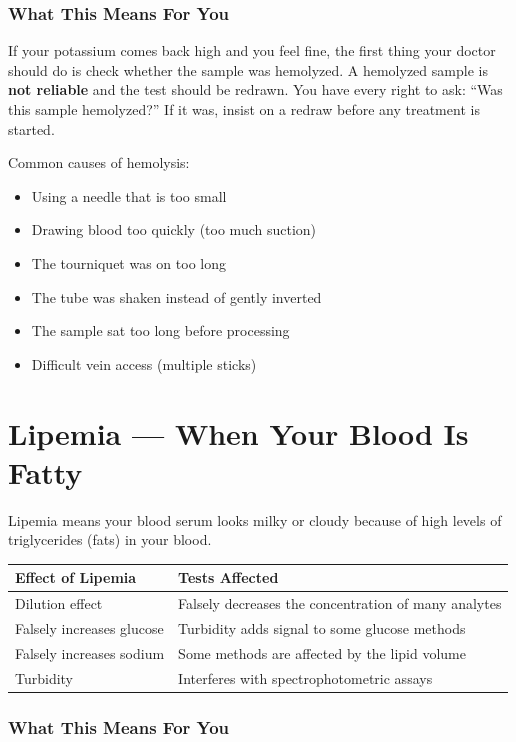 \subsubsection{What This Means For You}

If your potassium comes back high and you feel fine, the first thing your doctor should do is check whether the sample was hemolyzed. A hemolyzed sample is \textbf{not reliable} and the test should be redrawn. You have every right to ask: ``Was this sample hemolyzed?'' If it was, insist on a redraw before any treatment is started.

Common causes of hemolysis:
\begin{itemize}
    \item Using a needle that is too small
    \item Drawing blood too quickly (too much suction)
    \item The tourniquet was on too long
    \item The tube was shaken instead of gently inverted
    \item The sample sat too long before processing
    \item Difficult vein access (multiple sticks)
\end{itemize}

\clearpage
\section{Lipemia --- When Your Blood Is Fatty}

Lipemia means your blood serum looks milky or cloudy because of high levels of triglycerides (fats) in your blood.

\begin{longtable}{@{}ll@{}}
\toprule
\textbf{Effect of Lipemia} & \textbf{Tests Affected} \\
\midrule
Dilution effect & Falsely decreases the concentration of many analytes \\
Falsely increases glucose & Turbidity adds signal to some glucose methods \\
Falsely increases sodium & Some methods are affected by the lipid volume \\
Turbidity & Interferes with spectrophotometric assays \\
\bottomrule
\end{longtable}

\subsubsection{What This Means For You}

